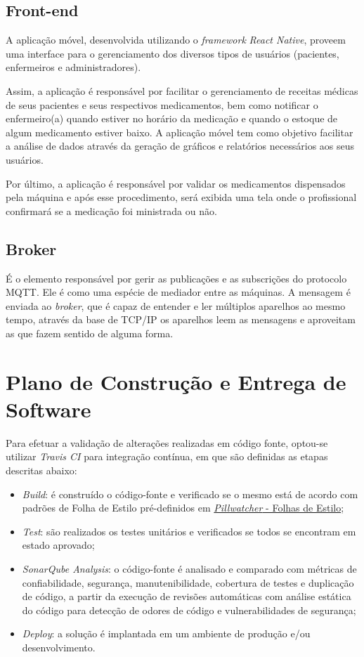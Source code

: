 \subsection{Front-end}
A aplicação móvel, desenvolvida utilizando o \emph{framework} \textit{React Native}, proveem uma interface para o gerenciamento dos diversos tipos de usuários (pacientes, enfermeiros e administradores). 

Assim, a aplicação é responsável por facilitar o gerenciamento de receitas médicas de seus pacientes e seus respectivos medicamentos, bem como notificar o enfermeiro(a) quando estiver no horário da medicação e quando o estoque de algum medicamento estiver baixo. A aplicação móvel tem como objetivo facilitar a análise de dados através da geração de gráficos e relatórios necessários aos seus usuários. 

Por último, a aplicação é responsável por validar os medicamentos dispensados pela máquina e após esse procedimento, será exibida uma tela onde o profissional confirmará se a medicação foi ministrada ou não.

\subsection{Broker}

É o elemento responsável por gerir as publicações e as subscrições do protocolo MQTT. Ele é como uma espécie de mediador entre as máquinas. A mensagem é enviada ao \textit{broker}, que é capaz de entender e ler múltiplos aparelhos ao mesmo tempo, através da base de TCP/IP os aparelhos leem as mensagens e aproveitam as que fazem sentido de alguma forma.


\section{Plano de Construção e Entrega de Software}
Para efetuar a validação de alterações realizadas em código fonte, optou-se utilizar \textit{Travis CI} para integração contínua, em que são definidas as etapas descritas abaixo:

\begin{itemize}
    \item \emph{Build}: é construído o código-fonte e verificado se o mesmo está de acordo com padrões de Folha de Estilo pré-definidos em \href{https://github.com/PillWatcher/Documentacao/wiki/Folha-de-Estilo}{\emph{Pillwatcher} - Folhas de Estilo};
    \item  \emph{Test}: são realizados os testes unitários e verificados se todos se encontram em estado aprovado;
    \item  \emph{SonarQube Analysis}: o código-fonte é analisado e comparado com métricas de confiabilidade, segurança, manutenibilidade, cobertura de testes e duplicação de código, a partir da execução de revisões automáticas com análise estática do código para detecção de odores de código e vulnerabilidades de segurança;
    \item  \emph{Deploy}: a solução é implantada em um ambiente de produção e/ou desenvolvimento. 
\end{itemize}


